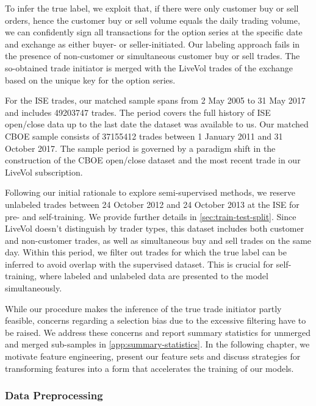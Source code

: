 To infer the true label, we exploit that, if there were only customer buy or sell orders, hence the customer buy or sell volume equals the daily trading volume, we can confidently sign all transactions for the option series at the specific date and exchange as either buyer- or seller-initiated. Our labeling approach fails in the presence of non-customer or simultaneous customer buy or sell trades. The so-obtained trade initiator is merged with the LiveVol trades of the exchange based on the unique key for the option series.

For the \gls{ISE} trades, our matched sample spans from 2 May 2005 to 31 May 2017 and includes \num{49203747} trades. The period covers the full history of \gls{ISE} open/close data up to the last date the dataset was available to us. Our matched \gls{CBOE} sample consists of \num{37155412} trades between 1 January 2011 and 31 October 2017. The sample period is governed by a paradigm shift in the construction of the \gls{CBOE} open/close dataset and the most recent trade in our LiveVol subscription.

Following our initial rationale to explore semi-supervised methods, we reserve unlabeled trades between 24 October 2012 and 24 October 2013 at the \gls{ISE} for pre- and self-training. We provide further details in \cref{sec:train-test-split}. Since LiveVol doesn't distinguish by trader types, this dataset includes both customer and non-customer trades, as well as simultaneous buy and sell trades on the same day. Within this period, we filter out trades for which the true label can be inferred to avoid overlap with the supervised dataset. This is crucial for self-training, where labeled and unlabeled data are presented to the model simultaneously.

While our procedure makes the inference of the true trade initiator partly feasible, concerns regarding a selection bias due to the excessive filtering have to be raised. We address these concerns and report summary statistics for unmerged and merged sub-samples in \cref{app:summary-statistics}. In the following chapter, we motivate feature engineering, present our feature sets and discuss strategies for transforming features into a form that accelerates the training of our models.

\subsubsection{Data Preprocessing}\label{sec:data-preprocessing}

